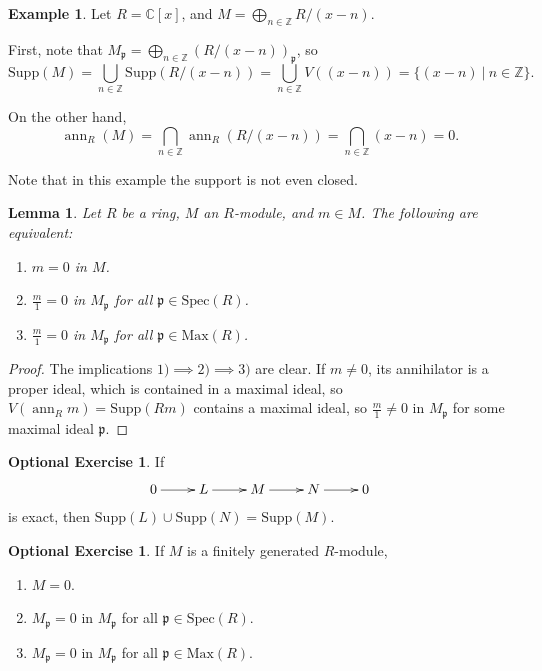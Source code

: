 \documentclass{amsart}[12pt]
\def\ann{\operatorname{ann}}
\newcommand{\CC}{\mathbb{C}}
\newcommand{\ZZ}{\mathbb{Z}}
\newcommand{\p}{{\mathfrak p}}
\numberwithin{equation}{section}
\theoremstyle{plain} %
\newtheorem{lemma}[equation]{Lemma}
\theoremstyle{definition}
\newtheorem{example}[equation]{Example}
\newtheorem{exer}[equation]{Optional Exercise}
\theoremstyle{remark}
\newcommand{\Max}{\mathrm{Max}}
\newcommand{\Spec}{\mathrm{Spec}}
\newcommand{\Supp}{\mathrm{Supp}}
\begin{document}
\begin{example}
	Let $R=\CC[x]$, and $M= \displaystyle\bigoplus_{n\in \ZZ} R/(x-n)$.
	
	First, note that $M_\p = \displaystyle\bigoplus_{n\in \ZZ} (R/(x-n))_{\p}$, so
	$$\Supp(M)= \bigcup_{n\in \ZZ} \Supp(R/(x-n))= \bigcup_{n\in \ZZ} V((x-n))=\{(x-n) \ | \ n \in \ZZ\}.$$

	On the other hand, 
	$$\ann_R(M)=\bigcap_{n\in \ZZ} \ann_R(R/(x-n)) = \bigcap_{n\in \ZZ} (x-n) = 0.$$
	
	Note that in this example the support is not even closed. 
\end{example}



\begin{lemma}\label{nonzero element localizes}
	Let $R$ be a ring, $M$ an $R$-module, and $m\in M$. The following are equivalent:
	\begin{enumerate}
		\item $m=0$ in $M$.
		\item $\frac{m}{1}=0$ in $M_\p$ for all $\p \in \Spec(R)$.
		\item $\frac{m}{1}=0$ in $M_\p$ for all $\p \in \Max(R)$.
	\end{enumerate}
\end{lemma}

\begin{proof}
	The implications $1) \implies 2) \implies 3)$ are clear. If $m\neq 0$, its annihilator is a proper ideal, which is contained in a maximal ideal, so $V(\ann_R m)=\Supp(Rm)$ contains a maximal ideal, so $\frac{m}{1} \neq 0$ in $M_\p$ for some maximal ideal $\p$.
\end{proof}
	
	\begin{exer} If 
	$$\xymatrix{0 \ar[r] & L \ar[r] & M \ar[r] & N \ar[r] & 0}$$ 
	is exact, then $\Supp(L) \cup \Supp(N) = \Supp(M)$. 
\end{exer}

\begin{exer}
	If $M$ is a finitely generated $R$-module,
	\begin{enumerate}
		\item $M=0$.
		\item $M_\p=0$ in $M_\p$ for all $\p \in \Spec(R)$.
		\item $M_\p=0$ in $M_\p$ for all $\p \in \Max(R)$.
	\end{enumerate}
\end{exer}
\end{document}
